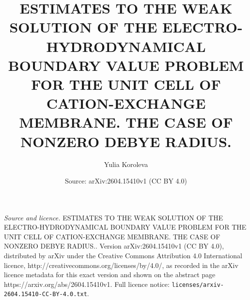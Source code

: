 \documentclass[10pt,a4paper]{amsart}
\title{ESTIMATES TO THE WEAK SOLUTION OF THE ELECTRO-HYDRODYNAMICAL BOUNDARY VALUE PROBLEM FOR THE UNIT CELL OF CATION-EXCHANGE MEMBRANE. THE CASE OF NONZERO DEBYE RADIUS.}
\author{Yulia Koroleva}
\date{Source: arXiv:2604.15410v1 (CC BY 4.0)}
\begin{document}
\maketitle

\noindent\emph{Source and licence.} ESTIMATES TO THE WEAK SOLUTION OF THE ELECTRO-HYDRODYNAMICAL BOUNDARY VALUE PROBLEM FOR THE UNIT CELL OF CATION-EXCHANGE MEMBRANE. THE CASE OF NONZERO DEBYE RADIUS.. Version arXiv:2604.15410v1 (CC BY 4.0), distributed by arXiv under the Creative Commons Attribution 4.0 International licence, http://creativecommons.org/licenses/by/4.0/, as recorded in the arXiv licence metadata for this exact version and shown on the abstract page https://arxiv.org/abs/2604.15410v1. Full licence notice: \texttt{licenses/arxiv-2604.15410-CC-BY-4.0.txt}.\par\smallskip
\end{document}
